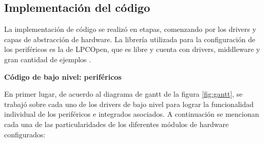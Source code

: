 \subsection{Implementación del código} \label{implementacion}

La implementación de código se realizó en etapas, comenzando por los drivers y capas de abstracción de hardware. La librería utilizada para la configuración de los periféricos es la de LPCOpen, que es libre y cuenta con drivers, middleware y gran cantidad de ejemplos \citep{lpcopen2014}.

\textbf{Código de bajo nivel: periféricos}

En primer lugar, de acuerdo al diagrama de gantt de la figura \ref{fig:gantt}, se trabajó sobre cada uno de los drivers de bajo nivel para lograr la funcionalidad individual de los periféricos e integrados asociados. A continuación se mencionan cada una de las particularidades de los diferentes módulos de hardware configurados: 

